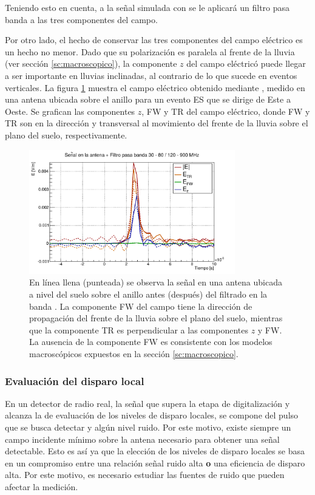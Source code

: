 	Teniendo esto en cuenta, a la se\~nal simulada con \zhs{} se le aplicar\'a un filtro pasa banda  a las tres componentes del campo.
	
	Por otro lado, el hecho de conservar las tres componentes del campo el\'ectrico es un hecho no menor.
	Dado que su polarizaci\'on es paralela al frente de la lluvia (ver secci\'on \ref{sc:macroscopico}), la componente $z$ del campo el\'ectric\'o puede llegar a ser importante en lluvias inclinadas, al contrario de lo que sucede en eventos verticales.
	La figura \ref{fig:antSig} muestra el campo el\'ectrico obtenido mediante \zhs{}, medido en una antena ubicada sobre el anillo \cher{} para un evento ES que se dirige de Este a Oeste.
	Se grafican las componentes $z$, FW y TR del campo eléctrico, donde FW y TR son en la direcci\'on y transversal al movimiento del frente de la lluvia sobre el plano del suelo, respectivamente.
	
	\begin{figure}[ht!]
		\centering
		\includegraphics[width=0.8\textwidth]{./fig/simulacionRadio/antennaFilt}
		\caption{\label{fig:antSig}
		En l\'inea llena (punteada) se observa la señal en una antena ubicada a nivel del suelo sobre el anillo \cher{} antes (despu\'es) del filtrado en la banda .  
		La componente FW del campo tiene la direcci\'on de propagaci\'on del frente de la lluvia sobre el plano del suelo, mientras que la componente TR es perpendicular a las componentes $z$ y FW.
		La ausencia de la componente FW es consistente con los modelos macrosc\'opicos expuestos en la secci\'on \ref{sc:macroscopico}.
		}
	\end{figure}
	
	\subsubsection{Evaluaci\'on del disparo local}
	\label{sbsc:localTriggerRadio}
	En un detector de radio real, la se\~nal que supera la etapa de digitalizaci\'on y alcanza la de evaluaci\'on de los niveles de disparo locales, se compone del pulso que se busca detectar y alg\'un nivel ruido.
	Por este motivo, existe siempre un campo incidente m\'inimo sobre la antena necesario para obtener una se\~nal detectable. 
	Esto es as\'i ya que la elecci\'on de los niveles de disparo locales se basa en un compromiso entre una relaci\'on se\~nal ruido alta \textbf{o} una eficiencia de disparo alta.
	Por este motivo, es necesario estudiar las fuentes de ruido que pueden afectar la medici\'on.
	
